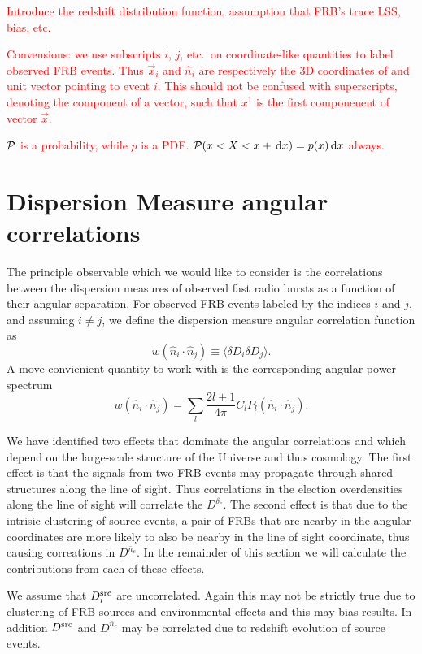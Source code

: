 \documentclass[onecolumn,prd,noshowpacs,nofootinbib,amsmath,amssymb]{revtex4}
\newcommand{\Dne}{D^{\bar{n}_e}}
\newcommand{\Dde}{D^{\delta_e}}
\newcommand{\Dsrc}{D^{\rm src}}
\newcommand{\del}{\delta\!}
\newcommand{\calP}{{\cal P}}
\newcommand{\ud}{\,\mathrm{d}}
\newcommand{\red}{\textcolor{red}}
\begin{document}
\red{Introduce the redshift distribution function, assumption that FRB's trace
LSS, bias, etc.}

\red{Convensions: we use subscripts $i$, $j$, etc.~on coordinate-like
    quantities to label observed FRB events. Thus $\vec x_i$ and $\hat{n}_i$
    are respectively the 3D coordinates of and unit vector pointing to event $i$.
    This should not be confused with superscripts, denoting the
component of a vector, such that $x^1$ is the first componenent of vector $\vec
x$.  }

\red{$\calP$ is a probability, while $p$ is a PDF. $\calP(x < X < x + \ud x) =
p(x) \ud x$ always.}


\section{Dispersion Measure angular correlations}

The principle observable which we would like to consider is the correlations
between the dispersion measures of observed fast radio bursts as a function of
their angular separation.  For observed FRB events labeled by the indices $i$
and $j$, and assuming $i \neq j$, we define the dispersion measure angular
correlation function as
\begin{equation}
    w(\hat{n}_i\cdot\hat{n}_j) \equiv \langle \del D_i \del D_j \rangle.
\end{equation}
A move convienient quantity to work with is the corresponding angular
power spectrum
\begin{equation}
w(\hat{n}_i \cdot\hat{n}_j) = \sum_l \frac{2l+1}{4 \pi} C_l
P_l(\hat{n}_i\cdot\hat{n}_j).
\end{equation}

We have identified two effects that dominate the angular
correlations and which depend on the large-scale structure of the Universe and
thus cosmology.  The first effect is that the signals from two FRB events may
propagate through shared structures along the line of sight.  Thus correlations
in the election overdensities along the line of sight will correlate the 
$\Dde$.  The second effect is that due to the intrisic clustering of source
events, a pair of FRBs that are nearby in the angular coordinates are more
likely to also be nearby in the line of sight coordinate, thus causing
correations in $\Dne$.  In the remainder of this section we will calculate the
contributions from each of these effects.

We assume that $D^{\rm src}_i$ are uncorrelated. Again this may not
be strictly true due to clustering of FRB sources and environmental effects
and this may bias results.  In addition $\Dsrc$ and $\Dne$ may be correlated due
to redshift evolution of source events.
\end{document}
